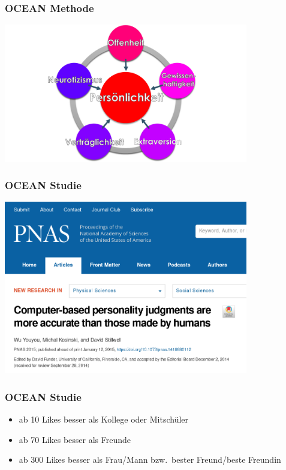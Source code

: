 \begin{frame}
	\frametitle{OCEAN Methode}
	\begin{center}
		\includegraphics[width=0.8\textwidth]{../../img/ocean-modell.png}
	\end{center}
\end{frame}

\begin{frame}
	\frametitle{OCEAN Studie}
	\begin{center}
		\includegraphics[width=0.8\textwidth]{../../img/ocean-facebook-studie.png}
	\end{center}
\end{frame}

\begin{frame}
	\frametitle{OCEAN Studie}
  \begin{itemize}
    \item<2-> ab 10 Likes besser als Kollege oder Mitschüler
    \item<3-> ab 70 Likes besser als Freunde
    \item<4-> ab 300 Likes besser als Frau/Mann bzw.\ bester Freund/beste Freundin
  \end{itemize}
\end{frame}
